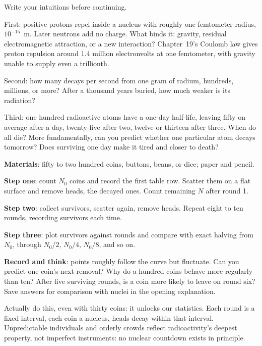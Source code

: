 
Write your intuitions before continuing.

First: positive protons repel inside a nucleus with roughly one-femtometer radius, \(10^{-15}\)~m. Later neutrons add no charge. What binds it: gravity, residual electromagnetic attraction, or a new interaction? Chapter~19's Coulomb law gives proton repulsion around 1.4 million electronvolts at one femtometer, with gravity unable to supply even a trillionth.

Second: how many decays per second from one gram of radium, hundreds, millions, or more? After a thousand years buried, how much weaker is its radiation?

Third: one hundred radioactive atoms have a one-day half-life, leaving fifty on average after a day, twenty-five after two, twelve or thirteen after three. When do all die? More fundamentally, can you predict whether one particular atom decays tomorrow? Does surviving one day make it tired and closer to death?


\begin{experiment}
\textbf{Materials}: fifty to two hundred coins, buttons, beans, or dice; paper and pencil.

\textbf{Step one}: count \(N_0\) coins and record the first table row. Scatter them on a flat surface and remove heads, the decayed ones. Count remaining \(N\) after round 1.

\textbf{Step two}: collect survivors, scatter again, remove heads. Repeat eight to ten rounds, recording survivors each time.

\textbf{Step three}: plot survivors against rounds and compare with exact halving from \(N_0\), through \(N_0/2\), \(N_0/4\), \(N_0/8\), and so on.

\textbf{Record and think}: points roughly follow the curve but fluctuate. Can you predict one coin's next removal? Why do a hundred coins behave more regularly than ten? After five surviving rounds, is a coin more likely to leave on round six? Save answers for comparison with nuclei in the opening explanation.
\end{experiment}

Actually do this, even with thirty coins: it unlocks our statistics. Each round is a fixed interval, each coin a nucleus, heads decay within that interval. Unpredictable individuals and orderly crowds reflect radioactivity's deepest property, not imperfect instruments: no nuclear countdown exists in principle.

